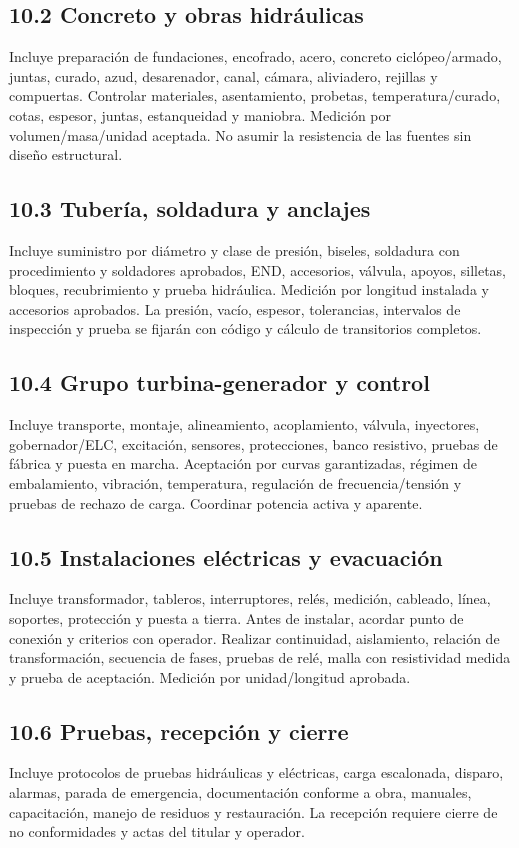 \documentclass[11pt,a4paper]{article}
\begin{document}
\subsection*{10.2 Concreto y obras hidráulicas}
Incluye preparación de fundaciones, encofrado, acero, concreto ciclópeo/armado, juntas, curado, azud, desarenador, canal, cámara, aliviadero, rejillas y compuertas. Controlar materiales, asentamiento, probetas, temperatura/curado, cotas, espesor, juntas, estanqueidad y maniobra. Medición por volumen/masa/unidad aceptada. No asumir la resistencia de las fuentes sin diseño estructural.

\subsection*{10.3 Tubería, soldadura y anclajes}
Incluye suministro por diámetro y clase de presión, biseles, soldadura con procedimiento y soldadores aprobados, END, accesorios, válvula, apoyos, silletas, bloques, recubrimiento y prueba hidráulica. Medición por longitud instalada y accesorios aprobados. La presión, vacío, espesor, tolerancias, intervalos de inspección y prueba se fijarán con código y cálculo de transitorios completos.

\subsection*{10.4 Grupo turbina-generador y control}
Incluye transporte, montaje, alineamiento, acoplamiento, válvula, inyectores, gobernador/ELC, excitación, sensores, protecciones, banco resistivo, pruebas de fábrica y puesta en marcha. Aceptación por curvas garantizadas, régimen de embalamiento, vibración, temperatura, regulación de frecuencia/tensión y pruebas de rechazo de carga. Coordinar potencia activa y aparente.

\subsection*{10.5 Instalaciones eléctricas y evacuación}
Incluye transformador, tableros, interruptores, relés, medición, cableado, línea, soportes, protección y puesta a tierra. Antes de instalar, acordar punto de conexión y criterios con operador. Realizar continuidad, aislamiento, relación de transformación, secuencia de fases, pruebas de relé, malla con resistividad medida y prueba de aceptación. Medición por unidad/longitud aprobada.

\subsection*{10.6 Pruebas, recepción y cierre}
Incluye protocolos de pruebas hidráulicas y eléctricas, carga escalonada, disparo, alarmas, parada de emergencia, documentación conforme a obra, manuales, capacitación, manejo de residuos y restauración. La recepción requiere cierre de no conformidades y actas del titular y operador.
\end{document}
